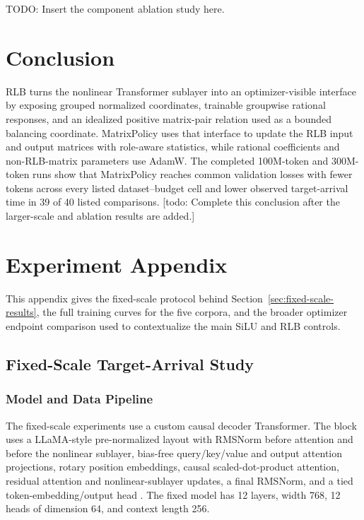 \documentclass{article}
\begin{document}
TODO: Insert the component ablation study here.


\section{Conclusion}
\label{sec:conclusion}

RLB turns the nonlinear Transformer sublayer into an optimizer-visible interface
by exposing grouped normalized coordinates, trainable groupwise rational
responses, and an idealized positive matrix-pair relation used as a bounded
balancing coordinate.  MatrixPolicy uses that interface to update the
RLB input and output matrices with role-aware statistics, while rational
coefficients and non-RLB-matrix parameters use AdamW.  The completed 100M-token
and 300M-token runs show that MatrixPolicy reaches common validation losses with
fewer tokens across every listed dataset--budget cell and lower observed
target-arrival time in 39 of 40 listed comparisons.  [todo: Complete this
conclusion after the larger-scale and ablation results are added.]




\appendix



\section{Experiment Appendix}
\label{app:experiments}

This appendix gives the fixed-scale protocol behind
Section~\ref{sec:fixed-scale-results}, the full training curves for the five
corpora, and the broader optimizer endpoint comparison used to contextualize the
main SiLU and RLB controls.

\subsection{Fixed-Scale Target-Arrival Study}
\label{app:experiment-protocol}

\subsubsection{Model and Data Pipeline}
\label{app:model-data}

The fixed-scale experiments use a custom causal decoder Transformer.  The block
uses a LLaMA-style pre-normalized layout with RMSNorm before attention and before
the nonlinear sublayer, bias-free query/key/value and output attention
projections, rotary position embeddings, causal scaled-dot-product attention,
residual attention and nonlinear-sublayer updates, a final RMSNorm, and a tied
token-embedding/output head \citep{zhang2019rmsnorm,su2021roformer,touvron2023llama}.
The fixed model has 12 layers, width 768, 12 heads of dimension 64, and context
length 256.
\end{document}
